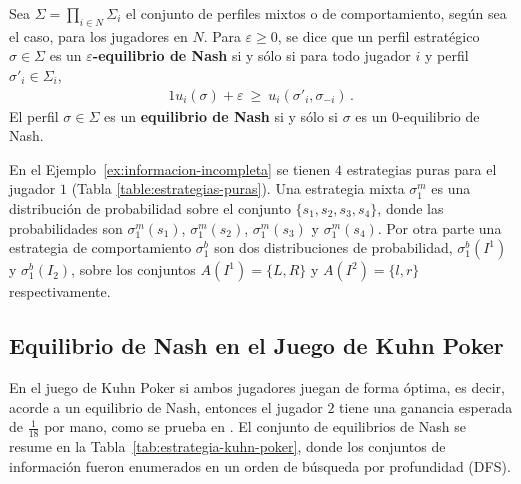 \begin{definition}
Sea $\Sigma=\prod_{i\in N}\Sigma_i$ el conjunto de perfiles mixtos o de comportamiento, según sea el caso, para los jugadores en $N$.
Para $\varepsilon\geq 0$, se dice que un perfil estratégico $\sigma \in \Sigma$ es un \textbf{$\varepsilon$-equilibrio de Nash} si y sólo si para todo jugador $i$ y perfil $\sigma'_i\in\Sigma_i$,
\begin{alignat}{1}
u_i(\sigma) + \varepsilon\ \geq\ u_i(\sigma'_i, \sigma_{-i}) \,.
\end{alignat}
El perfil $\sigma\in\Sigma$ es un \textbf{equilibrio de Nash} si y sólo si $\sigma$ es un $0$-equilibrio de Nash.
\end{definition}

En el Ejemplo~\ref{ex:informacion-incompleta} se tienen $4$ estrategias puras para el jugador $1$ (Tabla \ref{table:estrategias-puras}). Una estrategia mixta $\sigma^m_1$ es una distribución de probabilidad sobre el conjunto $\{s_1, s_2, s_3, s_4\}$, donde las probabilidades son $\sigma^m_1(s_1)$, $\sigma^m_1(s_2)$, $\sigma^m_1(s_3)$ y $\sigma^m_1(s_4)$. Por otra parte una estrategia de comportamiento $\sigma^b_1$ son dos distribuciones de probabilidad, $\sigma^b_1(I^1)$ y $\sigma^b_1(I_2)$, sobre los conjuntos $A(I^1) = \{L, R\}$ y $A(I^2) = \{l, r\}$ respectivamente.


\subsection*{Equilibrio de Nash en el Juego de Kuhn Poker}

En el juego de Kuhn Poker si ambos jugadores juegan de forma óptima, es decir, acorde a un equilibrio de Nash, entonces el jugador $2$ tiene una ganancia esperada de $\frac{1}{18}$ por mano, como se prueba en \cite{bib:kuhn-poker}. El conjunto de equilibrios de Nash se resume en la Tabla~\ref{tab:estrategia-kuhn-poker}, donde los conjuntos de información fueron enumerados en un orden de búsqueda por profundidad (DFS).

